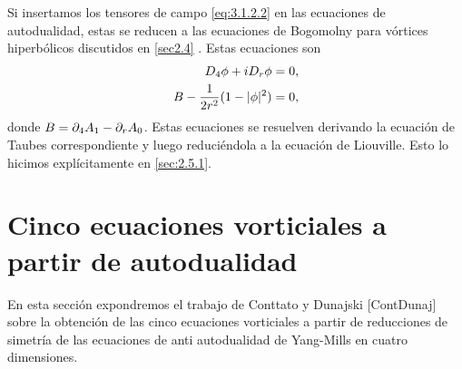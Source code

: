 Si insertamos los tensores de campo \eqref{eq:3.1.2.2} en las ecuaciones de autodualidad, estas se reducen a las ecuaciones de Bogomolny para vórtices hiperbólicos discutidos en \ref{sec2.4} . Estas ecuaciones son
\begin{align}
	\begin{split}
	D_4\phi+iD_r\phi &=0,\\
	B-\frac{1}{2r^2}(1-|\phi|^2) &=0,
	\end{split}
\end{align}
donde $B=\partial_4 A_1-\partial_r A_0$. Estas ecuaciones se resuelven derivando la ecuación de Taubes correspondiente y luego reduciéndola a la ecuación de Liouville. Esto lo hicimos explícitamente en \ref{sec:2.5.1}.


\section{Cinco ecuaciones vorticiales a partir de autodualidad}

En esta sección expondremos el trabajo de Conttato y Dunajski [ContDunaj] sobre la obtención de las cinco ecuaciones vorticiales a partir de reducciones de simetría de las ecuaciones de anti autodualidad de Yang-Mills en cuatro dimensiones.





